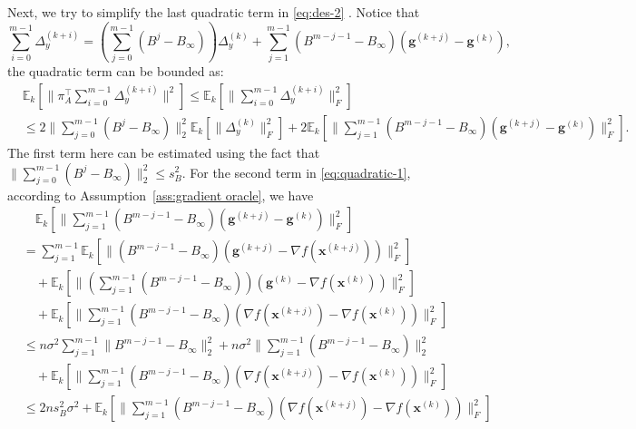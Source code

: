 \documentclass[10pt]{article}
\newcommand{\vg}{{\mathbf{g}}}
\newcommand{\vx}{{\mathbf{x}}}
\newcommand{\EE}{\mathbb{E}}
\newcommand{\norm}[1]{\| #1 \|}
\begin{document}
Next, we try to simplify the last quadratic term in \eqref{eq:des-2} . Notice that 
\[\sum_{i=0}^{m-1}\Delta_y^{(k+i)}=\left(\sum_{j=0}^{m-1}(B^j-B_\infty)\right)\Delta_y^{(k)}+\sum_{j=1}^{m-1}(B^{m-j-1}-B_\infty)(\vg^{(k+j)}-\vg^{(k)}),\]
the quadratic term can be bounded as:
\begin{align}\label{eq:quadratic-1}
    &\EE_k[\norm{\pi_A^\top \sum_{i=0}^{m-1}\Delta_y^{(k+i)}}^2]\le \EE_k[\norm{ \sum_{i=0}^{m-1}\Delta_y^{(k+i)}}_F^2]\\
    &\le 2 \norm{\sum_{j=0}^{m-1}(B^j-B_\infty)}_2^2\EE_k[\norm{\Delta_y^{(k)}}_F^2]+2\EE_k[\norm{\sum_{j=1}^{m-1}(B^{m-j-1}-B_\infty)(\vg^{(k+j)}-\vg^{(k)})}_F^2]\nonumber.
\end{align}
The first term here can be estimated using the fact that \(\norm{\sum_{j=0}^{m-1}(B^j-B_\infty)}_2^2\le s_B^2\). For the second term in \eqref{eq:quadratic-1}, according to Assumption~\ref{ass:gradient oracle}, we have
\begin{align}
    &\quad\EE_k[\norm{\sum_{j=1}^{m-1}(B^{m-j-1}-B_\infty)(\vg^{(k+j)}-\vg^{(k)})}_F^2]\\
    &= \sum_{j=1}^{m-1}\EE_k[\norm{(B^{m-j-1}-B_\infty)(\vg^{(k+j)}-\nabla f(\vx^{(k+j)}))}_F^2] \nonumber\\
    &\quad+\EE_k[\norm{(\sum_{j=1}^{m-1}(B^{m-j-1}-B_\infty))(\vg^{(k)}-\nabla f(\vx^{(k)}))}_F^2]\nonumber\\
    &\quad+\EE_k[\norm{\sum_{j=1}^{m-1}(B^{m-j-1}-B_\infty)(\nabla f(\vx^{(k+j)})-\nabla f(\vx^{(k)}))}_F^2]\nonumber\\
    &\le n\sigma^2\sum_{j=1}^{m-1}\norm{B^{m-j-1}-B_\infty}_2^2+n\sigma^2\norm{\sum_{j=1}^{m-1}(B^{m-j-1}-B_\infty)}_2^2\nonumber\\
    &\quad+\EE_k[\norm{\sum_{j=1}^{m-1}(B^{m-j-1}-B_\infty)(\nabla f(\vx^{(k+j)})-\nabla f(\vx^{(k)}))}_F^2]\nonumber\\
    &\le 2ns_B^2\sigma^2+\EE_k[\norm{\sum_{j=1}^{m-1}(B^{m-j-1}-B_\infty)(\nabla f(\vx^{(k+j)})-\nabla f(\vx^{(k)}))}_F^2]\nonumber
\end{align}
\end{document}
